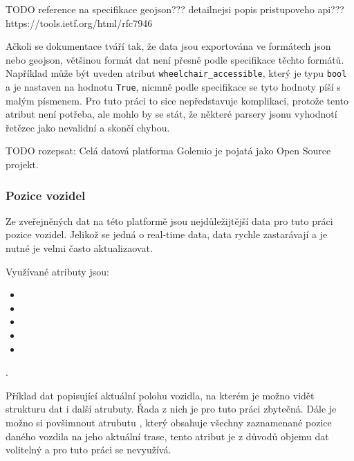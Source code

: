 TODO reference na specifikace geojson??? detailnejsi popis pristupoveho api??? https://tools.ietf.org/html/rfc7946

\bigbreak

Ačkoli se dokumentace tváří tak, že data jsou exportována ve formátech \gls{json} nebo \gls{geojson}, většinou formát dat není přesně podle specifikace těchto formátů. Například může být uveden atribut \verb"wheelchair_accessible", který je typu \verb"bool" a je nastaven na hodnotu \verb"True", nicmně podle specifikace se tyto hodnoty píší s malým písmenem. Pro tuto práci to sice nepředstavuje komplikaci, protože tento atribut není potřeba, ale mohlo by se stát, že některé parsery \gls{json}u vyhodnotí řetězec jako nevalidní a skončí chybou.

\bigbreak

TODO rozepsat: Celá datová platforma Golemio je pojatá jako Open Source projekt.

\subsubsection{Pozice vozidel}

Ze zveřejněných dat na této platformě jsou nejdůležijtější data pro tuto práci pozice vozidel. Jelikož se jedná o real-time data, data rychle zastarávají a je nutné je velmi často aktualizaovat.

\bigbreak

Využívané atributy jsou:

\begin{itemize}
	\item {}

	\item {}

	\item {}

	\item {}

	\item {}
\end{itemize}.

Příklad dat popisující aktuální polohu vozidla, na kterém je možno vidět strukturu dat i další atrubuty. Řada z nich je pro tuto práci zbytečná. Dále je možno si povšimnout atrubutu , který obsahuje všechny zaznamenané pozice daného vozdila na jeho aktuální trase, tento atribut je z důvodů objemu dat volitelný a pro tuto práci se nevyužívá.

